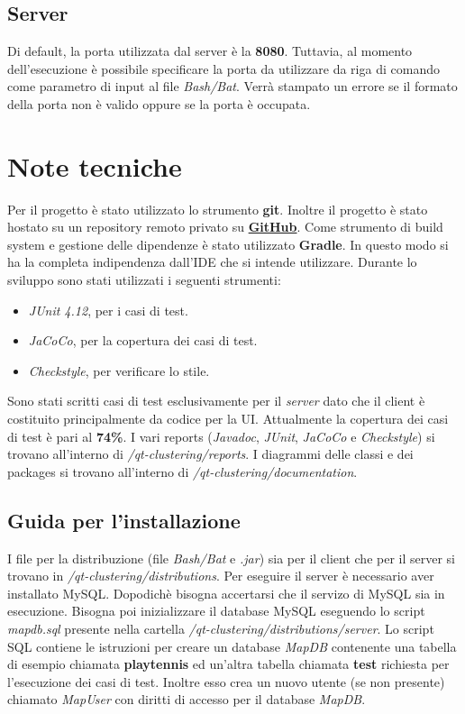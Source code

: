 \documentclass{article}
\begin{document}
	\subsection{Server}
	Di default, la porta utilizzata dal server è la \textbf{8080}.
	Tuttavia, al momento dell'esecuzione è possibile specificare
	la porta da utilizzare da riga di comando come parametro di
	input al file \textit{Bash/Bat}. Verrà stampato un errore
	se il formato della porta non è valido oppure se la porta è
	occupata.

	\section{Note tecniche}
	Per il progetto è stato utilizzato lo strumento \textbf{git}. Inoltre
	il progetto è stato hostato su un repository remoto privato su
	\href{https://github.com}{\textbf{GitHub}}. Come strumento di build
	system e gestione delle dipendenze è stato utilizzato \textbf{Gradle}.
	In questo modo si ha la completa indipendenza dall'IDE che si intende
	utilizzare. 
	Durante lo sviluppo sono stati utilizzati i seguenti strumenti:
	\begin{itemize}
		\item \textit{JUnit 4.12}, per i casi di test.
		\item \textit{JaCoCo}, per la copertura dei casi di test.
		\item \textit{Checkstyle}, per verificare lo stile.
	\end{itemize}
	Sono stati scritti casi di test esclusivamente per il \textit{server}
	dato che il client è costituito principalmente da codice per la UI.	
	Attualmente la copertura dei casi di test è pari al \textbf{74\%}.
	I vari reports (\textit{Javadoc}, \textit{JUnit}, \textit{JaCoCo} e
	\textit{Checkstyle}) si trovano all'interno di
	\textit{/qt-clustering/reports}.
	I diagrammi delle classi e dei packages si trovano all'interno di
	\textit{/qt-clustering/documentation}.

	\subsection {Guida per l'installazione}
	I file per la distribuzione (file \textit{Bash/Bat} e
	\textit{.jar}) sia per il client che per il server si trovano in
	\textit{/qt-clustering/distributions}.
	Per eseguire il server è necessario aver installato MySQL.
	Dopodichè bisogna accertarsi che il servizo di MySQL sia in
	esecuzione. Bisogna poi inizializzare il database MySQL eseguendo lo
	script \textit{mapdb.sql} presente nella cartella
	\textit{/qt-clustering/distributions/server}.
	Lo script SQL contiene le istruzioni per creare un database \textit{MapDB}
	contenente una tabella di esempio chiamata \textbf{playtennis}
	ed un'altra tabella chiamata \textbf{test} richiesta per
	l'esecuzione dei casi di test. Inoltre esso crea un nuovo utente
	(se non presente) chiamato \textit{MapUser} con diritti di accesso
	per il database \textit{MapDB}.
\end{document}
